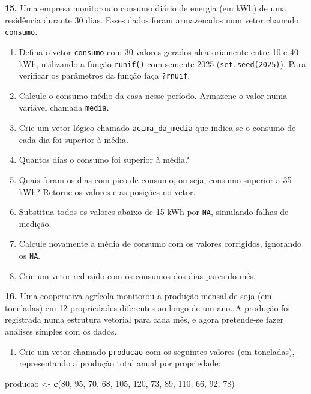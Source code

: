 \documentclass[
]{book}
\newenvironment{Shaded}{\begin{snugshade}}{\end{snugshade}}
\newcommand{\DecValTok}[1]{\textcolor[rgb]{0.00,0.00,0.81}{#1}}
\newcommand{\FunctionTok}[1]{\textcolor[rgb]{0.13,0.29,0.53}{\textbf{#1}}}
\newcommand{\NormalTok}[1]{#1}
\newcommand{\OtherTok}[1]{\textcolor[rgb]{0.56,0.35,0.01}{#1}}
\providecommand{\tightlist}{%
  \setlength{\itemsep}{0pt}\setlength{\parskip}{0pt}}
\begin{document}
\textbf{15.} Uma empresa monitorou o consumo diário de energia (em kWh) de uma residência durante 30 dias. Esses dados foram armazenados num vetor chamado \texttt{consumo}.

\begin{enumerate}
\def\labelenumi{(\alph{enumi})}
\item
  Defina o vetor \texttt{consumo} com 30 valores gerados aleatoriamente entre 10 e 40 kWh, utilizando a função \texttt{runif()} com semente 2025 (\texttt{set.seed(2025)}). Para verificar os parâmetros da função faça \texttt{?rnuif}.
\item
  Calcule o consumo médio da casa nesse período. Armazene o valor numa variável chamada \texttt{media}.
\item
  Crie um vetor lógico chamado \texttt{acima\_da\_media} que indica se o consumo de cada dia foi superior à média.
\item
  Quantos dias o consumo foi superior à média?
\item
  Quais foram os dias com pico de consumo, ou seja, consumo superior a 35 kWh? Retorne os valores e as posições no vetor.
\item
  Substitua todos os valores abaixo de 15 kWh por \texttt{NA}, simulando falhas de medição.
\item
  Calcule novamente a média de consumo com os valores corrigidos, ignorando os \texttt{NA}.
\item
  Crie um vetor reduzido com os consumos dos dias pares do mês.
\end{enumerate}

\textbf{16.} Uma cooperativa agrícola monitorou a produção mensal de soja (em toneladas) em 12 propriedades diferentes ao longo de um ano. A produção foi registrada numa estrutura vetorial para cada mês, e agora pretende-se fazer análises simples com os dados.

\begin{enumerate}
\def\labelenumi{(\alph{enumi})}
\tightlist
\item
  Crie um vetor chamado \texttt{producao} com os seguintes valores (em toneladas), representando a produção total anual por propriedade:
\end{enumerate}

\begin{Shaded}
\begin{Highlighting}[]
\NormalTok{producao }\OtherTok{\textless{}{-}} \FunctionTok{c}\NormalTok{(}\DecValTok{80}\NormalTok{, }\DecValTok{95}\NormalTok{, }\DecValTok{70}\NormalTok{, }\DecValTok{68}\NormalTok{, }\DecValTok{105}\NormalTok{, }\DecValTok{120}\NormalTok{, }\DecValTok{73}\NormalTok{, }\DecValTok{89}\NormalTok{, }\DecValTok{110}\NormalTok{, }\DecValTok{66}\NormalTok{, }\DecValTok{92}\NormalTok{, }\DecValTok{78}\NormalTok{)}
\end{Highlighting}
\end{Shaded}
\end{document}

